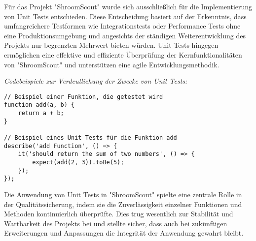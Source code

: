 \documentclass[../main.tex]{subfiles}
\begin{document}
Für das Projekt "ShroomScout" wurde sich ausschließlich für die Implementierung von Unit Tests entschieden. Diese Entscheidung basiert auf der Erkenntnis, dass 
umfangreichere Testformen wie Integrationstests oder Performance Tests ohne eine Produktionsumgebung und angesichts der ständigen Weiterentwicklung des Projekts 
nur begrenzten Mehrwert bieten würden. Unit Tests hingegen ermöglichen eine effektive und effiziente Überprüfung der Kernfunktionalitäten von "ShroomScout" und 
unterstützen eine agile Entwicklungsmethodik.

\textit{Codebeispiele zur Verdeutlichung der Zwecke von Unit Tests:}

\begin{verbatim}
// Beispiel einer Funktion, die getestet wird
function add(a, b) {
    return a + b;
}

// Beispiel eines Unit Tests für die Funktion add
describe('add Function', () => {
    it('should return the sum of two numbers', () => {
        expect(add(2, 3)).toBe(5);
    });
});
\end{verbatim}

Die Anwendung von Unit Tests in "ShroomScout" spielte eine zentrale Rolle in der Qualitätssicherung, indem sie die Zuverlässigkeit einzelner Funktionen und Methoden 
kontinuierlich überprüfte. Dies trug wesentlich zur Stabilität und Wartbarkeit des Projekts bei und stellte sicher, dass auch bei zukünftigen Erweiterungen und Anpassungen 
die Integrität der Anwendung gewahrt bleibt.
\end{document}
